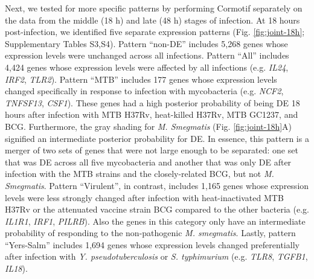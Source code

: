 Next, we tested for more specific patterns by performing Cormotif
separately on the data from the middle (18 h) and late (48 h) stages of
infection. At 18 hours post-infection, we identified five separate
expression patterns (Fig. \ref{fig:joint-18h}; Supplementary Tables S3,S4). Pattern
``non-DE'' includes 5,268 genes whose expression levels were unchanged
across all infections. Pattern ``All'' includes 4,424 genes whose
expression levels were affected by all infections (e.g. \emph{IL24},
\emph{IRF2}, \emph{TLR2}). Pattern ``MTB'' includes 177 genes whose
expression levels changed specifically in response to infection with
mycobacteria (e.g. \emph{NCF2}, \emph{TNFSF13}, \emph{CSF1}). These
genes had a high posterior probability of being DE 18 hours after
infection with MTB H37Rv, heat-killed H37Rv, MTB GC1237, and BCG.
Furthermore, the gray shading for \emph{M. Smegmatis} (Fig. \ref{fig:joint-18h}A)
signified an intermediate posterior probability for DE. In essence, this
pattern is a merger of two sets of genes that were not large enough to
be separated: one set that was DE across all five mycobacteria and
another that was only DE after infection with the MTB strains and the
closely-related BCG, but not \emph{M. Smegmatis}. Pattern ``Virulent'',
in contrast, includes 1,165 genes whose expression levels were less
strongly changed after infection with heat-inactivated MTB H37Rv or the
attenuated vaccine strain BCG compared to the other bacteria (e.g.
\emph{IL1R1}, \emph{IRF1}, \emph{PILRB}). Also the genes in this
category only have an intermediate probability of responding to the
non-pathogenic \emph{M. smegmatis}. Lastly, pattern ``Yers-Salm''
includes 1,694 genes whose expression levels changed preferentially
after infection with \emph{Y. pseudotuberculosis} or \emph{S.
typhimurium} (e.g. \emph{TLR8}, \emph{TGFB1}, \emph{IL18}).

